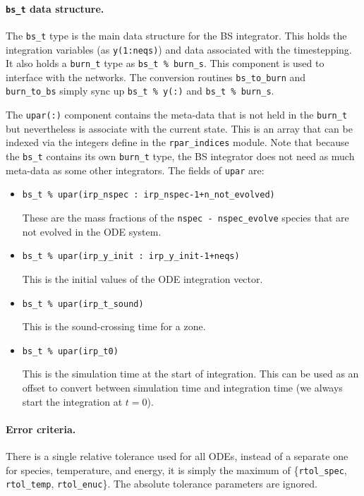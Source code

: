 \paragraph{{\tt bs\_t} data structure.}

The {\tt bs\_t} type is the main data structure for the BS integrator.
This holds the integration variables (as {\tt y(1:neqs)}) and data
associated with the timestepping.  It also holds a {\tt burn\_t} type
as {\tt bs\_t \% burn\_s}.  This component is used to interface with
the networks.  The conversion routines {\tt bs\_to\_burn} and {\tt
  burn\_to\_bs} simply sync up {\tt bs\_t \% y(:)} and {\tt bs\_t \%
  burn\_s}.

The {\tt upar(:)} component contains the meta-data that is not held in
the {\tt burn\_t} but nevertheless is associate with the current
state.  This is an array that can be indexed via the integers define
in the {\tt rpar\_indices} module.  Note that because the {\tt bs\_t}
contains its own {\tt burn\_t} type, the BS integrator does not need
as much meta-data as some other integrators.  The fields of {\tt upar}
are:
\begin{itemize}
\item {\tt bs\_t \% upar(irp\_nspec\,:\,irp\_nspec-1+n\_not\_evolved)}

  These are the mass fractions of the {\tt nspec - nspec\_evolve} 
  species that are not evolved in the ODE system.

\item {\tt bs\_t \% upar(irp\_y\_init\,:\,irp\_y\_init-1+neqs)}

  This is the initial values of the ODE integration vector.

\item {\tt bs\_t \% upar(irp\_t\_sound)}

  This is the sound-crossing time for a zone.

\item {\tt bs\_t \% upar(irp\_t0)}

  This is the simulation time at the start of integration.  This can
  be used as an offset to convert between simulation time and
  integration time (we always start the integration at $t = 0$).
\end{itemize}

\paragraph{Error criteria.}  There is a single relative tolerance used
for all ODEs, instead of a separate one for species, temperature, and
energy, it is simply the maximum of \{{\tt rtol\_spec}, {\tt
  rtol\_temp}, {\tt rtol\_enuc}\}.  The absolute tolerance parameters
are ignored.

